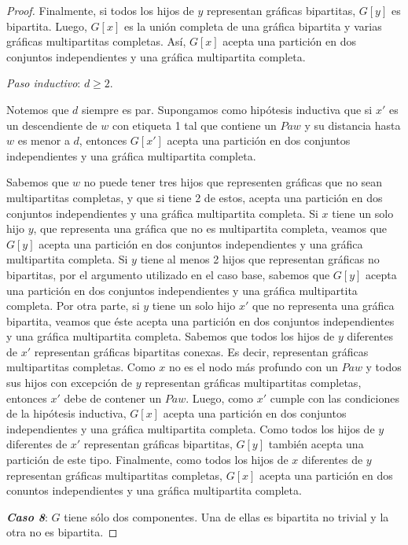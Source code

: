 \begin{proof}
Finalmente, si todos los hijos de $y$ representan gráficas bipartitas, $G[y]$ es bipartita. Luego, $G[x]$ es la unión completa de una gráfica bipartita y varias gráficas multipartitas completas. Así, $G[x]$ acepta una partición en dos conjuntos independientes y una gráfica multipartita completa.

\emph{Paso inductivo}: $d\geq 2$.

Notemos que $d$ siempre es par. Supongamos como hipótesis inductiva que si $x'$ es un descendiente de $w$ con etiqueta 1 tal que contiene un $Paw$ y su distancia hasta $w$ es menor a $d$, entonces $G[x']$ acepta una partición en dos conjuntos independientes y una gráfica multipartita completa.

Sabemos que $w$ no puede tener tres hijos que representen gráficas que no sean multipartitas completas, y que si tiene 2 de estos, acepta una partición en dos conjuntos independientes y una gráfica multipartita completa. Si $x$ tiene un solo hijo $y$, que representa una gráfica que no es multipartita completa, veamos que $G[y]$ acepta una partición en dos conjuntos independientes y una gráfica multipartita completa. Si $y$ tiene al menos 2 hijos que representan gráficas no bipartitas, por el argumento utilizado en el caso base, sabemos que $G[y]$ acepta una partición en dos conjuntos independientes y una gráfica multipartita completa. Por otra parte, si $y$ tiene un solo hijo $x'$ que no representa una gráfica bipartita, veamos que éste acepta una partición en dos conjuntos independientes y una gráfica multipartita completa. Sabemos que todos los hijos de $y$ diferentes de $x'$ representan gráficas bipartitas conexas. Es decir, representan gráficas multipartitas completas. Como $x$ no es el nodo más profundo con un $Paw$ y todos sus hijos con excepción de $y$ representan gráficas multipartitas completas, entonces $x'$ debe de contener un $Paw$. Luego, como $x'$ cumple con las condiciones de la hipótesis inductiva, $G[x]$ acepta una partición en dos conjuntos independientes y una gráfica multipartita completa. Como todos los hijos de $y$ diferentes de $x'$ representan gráficas bipartitas, $G[y]$ también acepta una partición de este tipo. Finalmente, como todos los hijos de $x$ diferentes de $y$ representan gráficas multipartitas completas, $G[x]$ acepta una partición en dos conuntos independientes y una gráfica multipartita completa.

\emph{\textbf{Caso 8}}: $G$ tiene sólo dos componentes. Una de ellas es bipartita no trivial y la otra no es bipartita.


\end{proof}
